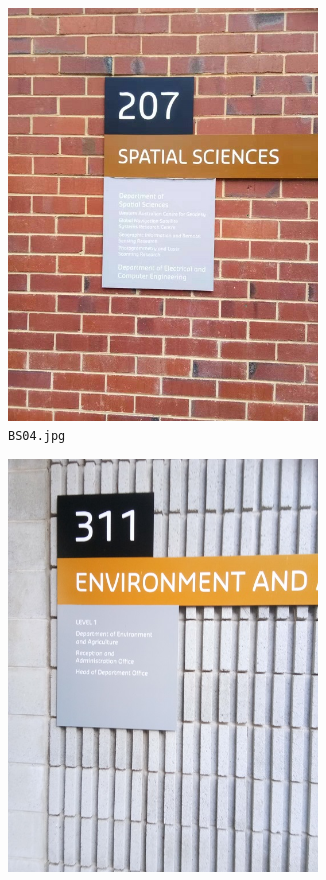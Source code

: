 \documentclass{article}
\begin{document}
\begin{figure}[h]
\begin{subfigure}[h]{0.22\textwidth}
    \includegraphics[width=0.9\textwidth]{../train/task1/BS04}
    \caption[BS04]{
      \lstinline{BS04.jpg}
    }
    \label{fig:bs04}
  \end{subfigure}
  \begin{subfigure}[h]{0.22\textwidth}
    \centering
    \includegraphics[width=0.9\textwidth]{../train/task1/BS09}

\end{subfigure}
\end{figure}
\end{document}
